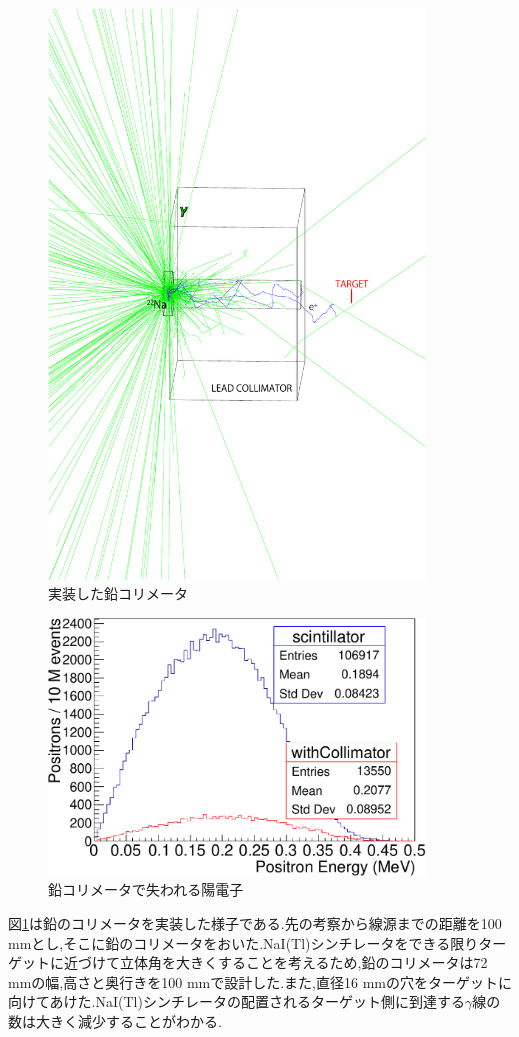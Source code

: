 \begin{figure}[!tbp]
	\centering
		\includegraphics[width=10cm]{img/test1b_geometry.pdf}
	\caption{実装した鉛コリメータ}
	\label{test1b_geometry}
\end{figure}

\begin{figure}[!tbp]
	\centering
		\includegraphics[width=10cm]{fig/collimator_loss.pdf}
	\caption{鉛コリメータで失われる陽電子}
	\label{collimator_loss}
\end{figure}

図\ref{test1b_geometry}は鉛のコリメータを実装した様子である.先の考察から線源までの距離を100 mmとし,そこに鉛のコリメータをおいた.NaI(Tl)シンチレータをできる限りターゲットに近づけて立体角を大きくすることを考えるため,鉛のコリメータは72 mmの幅,高さと奥行きを100 mmで設計した.また,直径16 mmの穴をターゲットに向けてあけた.NaI(Tl)シンチレータの配置されるターゲット側に到達する$\gamma$線の数は大きく減少することがわかる.

